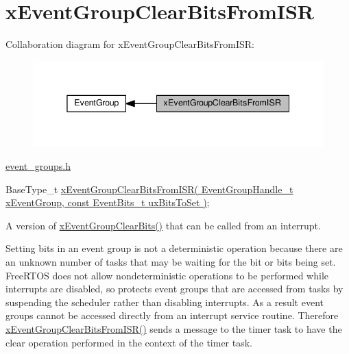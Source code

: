 \hypertarget{group__x_event_group_clear_bits_from_i_s_r}{}\section{x\+Event\+Group\+Clear\+Bits\+From\+I\+SR}
\label{group__x_event_group_clear_bits_from_i_s_r}
Collaboration diagram for x\+Event\+Group\+Clear\+Bits\+From\+I\+SR\+:\nopagebreak
\begin{figure}[H]
\begin{center}
\leavevmode
\includegraphics[width=338pt]{group__x_event_group_clear_bits_from_i_s_r}
\end{center}
\end{figure}
\hyperlink{event__groups_8h}{event\+\_\+groups.\+h} 
\begin{DoxyPre}
   BaseType\_t \hyperlink{event__groups_8h_a3d7de214a697f33fe7b914e26a93f33a}{xEventGroupClearBitsFromISR( EventGroupHandle\_t xEventGroup, const EventBits\_t uxBitsToSet )};
\end{DoxyPre}


A version of \hyperlink{event__groups_8h_a0fb72cfdd4f0d5f86d955fc3af448f2a}{x\+Event\+Group\+Clear\+Bits()} that can be called from an interrupt.

Setting bits in an event group is not a deterministic operation because there are an unknown number of tasks that may be waiting for the bit or bits being set. Free\+R\+T\+OS does not allow nondeterministic operations to be performed while interrupts are disabled, so protects event groups that are accessed from tasks by suspending the scheduler rather than disabling interrupts. As a result event groups cannot be accessed directly from an interrupt service routine. Therefore \hyperlink{event__groups_8h_a3d7de214a697f33fe7b914e26a93f33a}{x\+Event\+Group\+Clear\+Bits\+From\+I\+S\+R()} sends a message to the timer task to have the clear operation performed in the context of the timer task.


